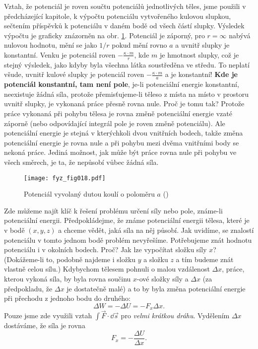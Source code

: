     Vztah, že potenciál je roven součtu potenciálů jednotlivých těles, jsme použili v předcházející 
    kapitole, k výpočtu potenciálu vytvořeného kulovou slupkou, sečtením příspěvků k 
    potenciálu v daném bodě od všech částí slupky. Výsledek výpočtu je graficky znázorněn na obr. 
    \ref{fyz:fig018}. Potenciál je záporný, pro \(r=\infty\) nabývá nulovou hodnotu, mění se jako 
    \(1/r\) pokud mění rovno \(a\) a uvnitř slupky je konstantní. Venku je potenciál roven 
    \(-\frac{\kappa\cdot m}{r}\), kde \(m\) je hmotnost slupky, což je stejný výsledek, jako kdyby 
    byla všechna látka soustředěna ve středu. To neplatí všude, uvnitř kulové slupky je potenciál 
    roven \(-\frac{\kappa\cdot m}{a}\) a je konstantní! \textbf{Kde je potenciál konstantní, tam 
    není pole}, je-li potenciální energie konstantní, neexistuje žádná síla, protože 
    přemisťujeme-li těleso z místa na místo v prostoru uvnitř slupky, je vykonaná práce přesně 
    rovna nule. Proč je tomu tak? Protože práce vykonaná při pohybu tělesa je rovna změně 
    potenciální energie vzaté záporně (nebo odpovídající integrál pole je roven změně potenciálu). 
    Ale potenciální energie je stejná v kterýchkoli dvou vnitřních bodech, takže změna potenciální 
    energie je rovna nule a při pohybu mezi dvěma vnitřními body se nekoná práce. Jediná možnost, 
    jak může být práce rovna nule při pohybu ve všech směrech, je ta, že nepůsobí vůbec žádná síla.
    
    \begin{figure}[ht!]  %
      \centering
      \texttt{[image: fyz\_fig018.pdf]}
      \caption{Potenciál vyvolaný dutou koulí o poloměru \(a\) (\cite[s.~205]{Feynman01})}
      \label{fyz:fig018}
    \end{figure}    
    Zde můžeme najít klíč k řešení problému určení síly nebo pole, známe-li potenciální energii. 
    Předpokládejme, že známe potenciální energii tělesa, které je v bodě \((x, y, z)\) a chceme 
    vědět, jaká síla na něj působí. Jak uvidíme, se znalostí potenciálu v tomto jednom bodě problém 
    nevyřešíme. Potřebujeme znát hodnotu potenciálu i v okolních bodech. Proč? Jak lze vypočítat 
    složku síly \(x\)? (Dokážeme-li to, podobně najdeme i složku \(y\) a složku \(z\) a tím budeme 
    znát vlastně celou sílu.) Kdybychom tělesem pohnuli o malou vzdálenost \(\Delta x\), práce, 
    kterou vykoná síla, by byla rovna součinu \(x\)-ové složky síly a \(\Delta x\) (za předpokladu, 
    že \(\Delta x\) je dostatečně malé) a to by byla změna potenciální energie při přechodu z 
    jednoho bodu do druhého:
    \begin{equation}\label{FYZ:eq004}
      \Delta W = - \Delta U = - F_x\Delta x.
    \end{equation}
    Pouze jsme zde využili vztah \(\int\vec{F}\cdot\dd{\vec{s}}\) pro \emph{velmi krátkou dráhu}. 
    Vydělením \(\Delta x\) dostáváme, že síla je rovna
    \begin{equation}\label{FYZ:eq005}
      F_x = -\frac{\Delta U}{\Delta x}.
    \end{equation}
    
